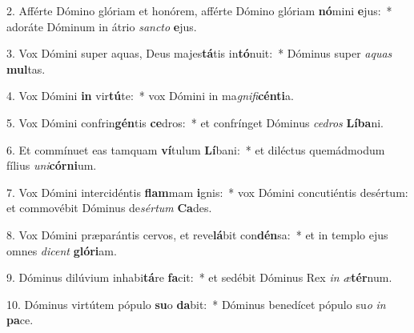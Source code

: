 2. Afférte Dómino glóriam et honórem, afférte Dómino glóriam \textbf{nó}mini \textbf{e}jus:~*  adoráte Dóminum in átrio \textit{sanc}\textit{to} \textbf{e}jus.\

3. Vox Dómini super aquas, Deus majes\textbf{tá}tis in\textbf{tó}nuit:~*  Dóminus super \textit{a}\textit{quas} \textbf{mul}tas.\

4. Vox Dómini \textbf{in} vir\textbf{tú}te:~*  vox Dómini in ma\textit{gni}\textit{fi}\textbf{cén}\textbf{ti}a.\

5. Vox Dómini confrin\textbf{gén}tis \textbf{ce}dros:~*  et confrínget Dóminus \textit{ce}\textit{dros} \textbf{Lí}\textbf{ba}ni.\

6. Et commínuet eas tamquam \textbf{ví}tulum \textbf{Lí}bani:~*  et diléctus quemádmodum fílius \textit{u}\textit{ni}\textbf{cór}\textbf{ni}um.\

7. Vox Dómini intercidéntis \textbf{flam}mam \textbf{i}gnis:~*  vox Dómini concutiéntis desértum: et commovébit Dóminus de\textit{sér}\textit{tum} \textbf{Ca}des.\

8. Vox Dómini præparántis cervos, et reve\textbf{lá}bit con\textbf{dén}sa:~*  et in templo ejus omnes \textit{di}\textit{cent} \textbf{gló}\textbf{ri}am.\

9. Dóminus dilúvium inhabi\textbf{tá}re \textbf{fa}cit:~*  et sedébit Dóminus Rex \textit{in} \textit{æ}\textbf{tér}num.\

10. Dóminus virtútem pópulo \textbf{su}o \textbf{da}bit:~*  Dóminus benedícet pópulo su\textit{o} \textit{in} \textbf{pa}ce.\

